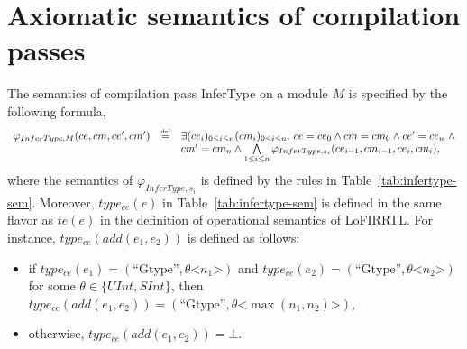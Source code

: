 
\section{Axiomatic semantics of compilation passes}\label{sec-appen-sem-cpass}

The semantics of compilation pass InferType on a module $M$ is specified by the following formula, 
\[
\begin{array}{l c l}
\varphi_{InferType, M}(ce, cm, ce', cm') & \egdef & \exists (ce_i)_{0 \le i \le n} (cm_i)_{0 \le i \le n}.\ ce = ce_0 \wedge cm = cm_0 \wedge ce' = ce_n\ \wedge \\
& &  cm' = cm_n \wedge \bigwedge \limits_{1 \le i \le n} \varphi_{InferType, s_i}(ce_{i-1}, cm_{i-1}, ce_i, cm_i),
\end{array}
\] 
where the semantics of $\varphi_{InferType, s_i}$ is defined by the rules in Table~\ref{tab:infertype-sem}. Moreover, 
$type_{ce}(e)$ in Table~\ref{tab:infertype-sem} is defined in the same flavor as $te(e)$ in the definition of operational semantics of LoFIRRTL. For instance, $type_{ce}(add(e_1, e_2))$ is defined as follows: 
\begin{itemize}
\item if $type_{ce}(e_1) = (\mbox{``Gtype''}, \theta\mbox{<}n_1\mbox{>})$ and  $type_{ce}(e_2) = (\mbox{``Gtype''}, \theta\mbox{<}n_2\mbox{>})$ for some $\theta \in \{UInt, SInt\}$, then $type_{ce}(add(e_1, e_2)) = (\mbox{``Gtype''}, \theta\mbox{<}\max(n_1,n_2)\mbox{>})$,
\item otherwise, $type_{ce}(add(e_1, e_2)) = \bot$.
\end{itemize}


